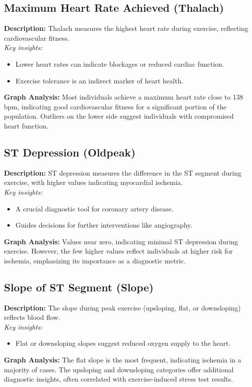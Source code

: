 \documentclass[pdflatex,sn-nature,Numbered]{sn-jnl}%
\theoremstyle{thmstyleone}%
\theoremstyle{thmstyletwo}%
\theoremstyle{thmstylethree}%
\begin{document}
\subsection{Maximum Heart Rate Achieved (Thalach)}
\textbf{Description:} 
Thalach measures the highest heart rate during exercise, reflecting cardiovascular fitness. \\
\textit{Key insights:}
\begin{itemize}
    \item Lower heart rates can indicate blockages or reduced cardiac function.
    \item Exercise tolerance is an indirect marker of heart health.
\end{itemize}
\textbf{Graph Analysis:} 
Most individuals achieve a maximum heart rate close to 138 bpm, indicating good cardiovascular fitness for a significant portion of the population. Outliers on the lower side suggest individuals with compromised heart function.

\subsection{ST Depression (Oldpeak)}
\textbf{Description:} 
ST depression measures the difference in the ST segment during exercise, with higher values indicating myocardial ischemia. \\
\textit{Key insights:}
\begin{itemize}
    \item A crucial diagnostic tool for coronary artery disease.
    \item Guides decisions for further interventions like angiography.
\end{itemize}
\textbf{Graph Analysis:} 
Values near zero, indicating minimal ST depression during exercise. However, the few higher values reflect individuals at higher risk for ischemia, emphasizing its importance as a diagnostic metric.

\subsection{Slope of ST Segment (Slope)}
\textbf{Description:} 
The slope during peak exercise (upsloping, flat, or downsloping) reflects blood flow. \\
\textit{Key insights:}
\begin{itemize}
    \item Flat or downsloping slopes suggest reduced oxygen supply to the heart.
\end{itemize}
\textbf{Graph Analysis:} 
The flat slope is the most frequent, indicating ischemia in a majority of cases. The upsloping and downsloping categories offer additional diagnostic insights, often correlated with exercise-induced stress test results.
\end{document}
